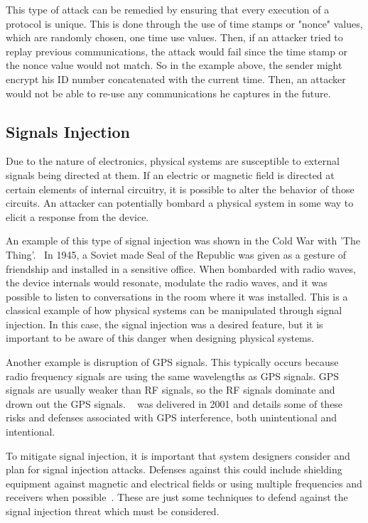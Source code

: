 This type of attack can be remedied by ensuring that every execution of a protocol is unique. This is done through the use of
time stamps or "nonce" values, which are randomly chosen, one time use values. Then, if an attacker tried to replay previous
communications, the attack would fail since the time stamp or the nonce value would not match. So in the example above, the
sender might encrypt his ID number concatenated with the current time. Then, an attacker would not be able to re-use any
communications he captures in the future.

\subsection{Signals Injection}
Due to the nature of electronics, physical systems are susceptible to external signals being directed at them. If an electric or 
magnetic field is directed at certain elements of internal circuitry, it is possible to alter the behavior of those circuits. An attacker
can potentially bombard a physical system in some way to elicit a response from the device.

An example of this type of signal injection was shown in the Cold War with 'The Thing'.~\cite{thing} In 1945, a Soviet made Seal of the 
Republic was given as a gesture of friendship and installed in a sensitive office. When bombarded with radio waves, the device internals
would resonate, modulate the radio waves, and it was possible to listen to conversations in the room where it was installed. This is a
classical example of how physical systems can be manipulated through signal injection. In this case, the signal injection was a desired
feature, but it is important to be aware of this danger when designing physical systems.

Another example is disruption of GPS signals. This typically occurs because radio frequency signals are using the same wavelengths as
GPS signals. GPS signals are usually weaker than RF signals, so the RF signals dominate and drown out the GPS signals. ~\cite{gpsdisruption} 
was delivered in 2001 and details some of these risks and defenses associated with GPS interference, both unintentional and intentional.

To mitigate signal injection, it is important that system designers consider and plan for signal injection attacks. Defenses against this could
include shielding equipment against magnetic and electrical fields or using multiple frequencies and receivers when possible~\cite{gpsdisruption}.
These are just some techniques to defend against the signal injection threat which must be considered.

